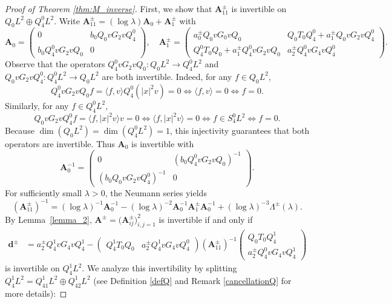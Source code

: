 \documentclass[reqno]{amsart}
\numberwithin{equation}{section}
\begin{document}
\begin{proof}[Proof of Theorem \ref{thm:M_inverse}]
	First, we show that $\mathbf{A}_{11}^{\pm}$ is invertible on $Q_0 L^2 \oplus Q_4^0 L^2$. Write $\mathbf{A}_{11}^{\pm} = (\log \lambda) \mathbf{A}_0 + \mathbf{A}_1^\pm$ with
	\[
	\mathbf{A}_0 = \begin{pmatrix}
		0 & b_0 Q_0 v G_2 v Q_4^0 \\
		b_0 Q_4^0 v G_2 v Q_0 & 0
	\end{pmatrix},\quad
	\mathbf{A}_1^\pm = \begin{pmatrix}
		a_0^\pm Q_0 v G_0 v Q_0 & Q_0 T_0 Q_4^0 + a_1^{\pm} Q_0 v G_2 v Q_4^0 \\
		Q_4^0 T_0 Q_0 + a_1^{\pm} Q_4^0 v G_2 v Q_0 & a_2^\pm Q_4^0 v G_4 v Q_4^0
	\end{pmatrix}.
	\]
	Observe that the operators $Q_4^0 v G_2 v Q_0 \colon Q_0 L^2 \to Q_4^0 L^2$ and $Q_0 v G_2 v Q_4^0 \colon Q_4^0 L^2 \to Q_0 L^2$ are both invertible. Indeed, for any $f\in Q_0 L^2$,
	$$
	Q_4^0 v G_2 v Q_0 f = \langle f, v \rangle Q_4^0 (|x|^2 v)=0 \Longleftrightarrow
	\langle f, v \rangle = 0 \Longleftrightarrow f = 0.
	$$
	Similarly, for any $f \in Q_4^0 L^2$,
		$$
	Q_0 v G_2 v Q_4^0 f = \langle f, |x|^2 v \rangle v = 0 \Longleftrightarrow \langle f, |x|^2 v \rangle = 0 \Longleftrightarrow f \in S_4^0 L^2 \Longleftrightarrow f=0.
	$$
    Because $\dim(Q_0 L^2) = \dim(Q_4^0 L^2) = 1$, this injectivity guarantees that both operators are invertible. Thus $\mathbf{A}_0$ is invertible with
	\[
	\mathbf{A}_0^{-1} = \begin{pmatrix}
		0 & (b_0 Q_4^0 v G_2 v Q_0)^{-1} \\
		(b_0 Q_0 v G_2 v Q_4^0)^{-1} & 0
	\end{pmatrix}.
	\]
	For sufficiently small $\lambda>0$, the Neumann series yields
	\begin{equation}\label{eq:inverse_A_11}
		(\mathbf{A}_{11}^{\pm})^{-1} = (\log \lambda)^{-1} \mathbf{A}_0^{-1} - (\log \lambda)^{-2} \mathbf{A}_0^{-1} \mathbf{A}_1^\pm \mathbf{A}_0^{-1} + (\log \lambda)^{-3}\Lambda^\pm(\lambda).
	\end{equation}
	By Lemma~\ref{lemma_2}, $\mathbf{A}^{\pm} = \bigl( \mathbf{A}_{ij}^{\pm}\bigr)_{i,j=1}^2$ is invertible if and only if
	$$
	\begin{aligned}
		\boldsymbol{d}^\pm 
		&= a_2^\pm Q_4^1 v G_4 v Q_4^1
		- \begin{pmatrix} Q_4^1 T_0 Q_0 & a_2^\pm Q_4^1 v G_4 v Q_4^0 \end{pmatrix}
		(\mathbf{A}_{11}^{\pm})^{-1}
		\begin{pmatrix} Q_0 T_0 Q_4^1 \\ a_2^\pm Q_4^0 v G_4 v Q_4^1 \end{pmatrix}
	\end{aligned}
	$$
	is invertible on $Q_4^1 L^2$.   We analyze this  invertibility  by splitting $Q_4^1 L^2 = Q_{41}^1 L^2 \oplus Q_{42}^1 L^2$  (see Definition  \ref{defQ} and  Remark \ref{cancellationQ} for more details):


\end{proof}
\end{document}
